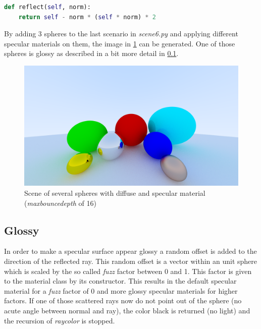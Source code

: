 \documentclass[]{article}
\begin{document}
		\begin{lstlisting}[caption={Method for reflecting a vector on a normal vector}, language=Python, label=lst:reflect]
def reflect(self, norm):
	return self - norm * (self * norm) * 2
		\end{lstlisting}
		
		By adding 3 spheres to the last scenario in \emph{scene6.py} and applying different specular materials on them, the image in \cref{fig:image6} can be generated. One of those spheres is glossy as described in a bit more detail in \cref{sec:glossy}.
		
		\begin{figure}[h]
			\centering
			\includegraphics[width=0.9\linewidth]{image6-5}
			\caption{Scene of several spheres with diffuse and specular material (\emph{max\textunderscore bounce\textunderscore depth} of 16)}
			\label{fig:image6}
		\end{figure}
	
		\subsection{Glossy}
		\label{sec:glossy}
		In order to make a specular surface appear glossy a random offset is added to the direction of the reflected ray. This random offset is a vector within an unit sphere which is scaled by the so called \emph{fuzz} factor between 0 and 1. This factor is given to the material class by its constructor. This results in the default specular material for a \emph{fuzz} factor of 0 and more glossy specular materials for higher factors. If one of those scattered rays now do not point out of the sphere (no acute angle between normal and ray), the color black is returned (no light) and the recursion of \emph{ray\textunderscore color} is stopped.
	
\end{document}
